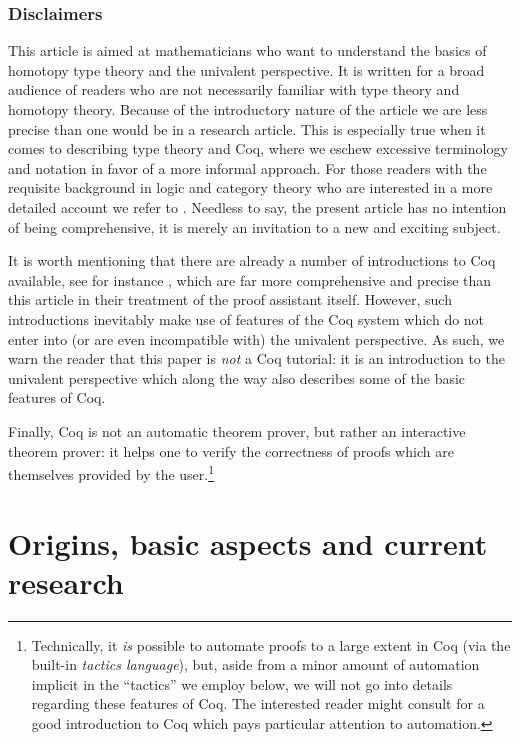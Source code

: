 \documentclass{amsart}
\theoremstyle{definition}
\theoremstyle{remark}
\numberwithin{equation}{section}
\begin{document}
\subsubsection*{Disclaimers}

This article is aimed at mathematicians who want to understand the basics
of homotopy type theory and the univalent perspective. It is
written for a broad audience of readers who are not necessarily
familiar with type theory and homotopy theory. Because of the
introductory nature of the article we are less precise than one would
be in a research article.  This is especially true when it comes to
describing type theory and Coq, where we eschew excessive terminology
and notation in favor of a more informal approach.  For those readers
with the requisite background in logic and category theory who are
interested in a more detailed account we refer to \cite{Awodey:TTH}.  Needless
to say, the present article has no intention of being comprehensive,
it is merely an invitation to a new and exciting subject.

It is worth mentioning that there are already a number of introductions
to Coq available, see for instance \cite{Bertot:2004uj}, which are far
more comprehensive and precise than this article in their treatment of
the proof assistant itself.  However, such introductions inevitably
make use of features of the Coq system which do not enter into (or are
even incompatible with) the univalent perspective.  As such, we warn
the reader that this paper is \emph{not} a Coq tutorial: it is an
introduction to the univalent perspective which along the way
also describes some of the basic features of Coq.

Finally, Coq is not an automatic theorem prover, but rather an interactive
theorem prover: it helps one to verify the correctness of proofs which
are themselves provided by the user.\footnote{Technically, it \emph{is}
  possible to automate proofs to a large extent in Coq (via the built-in
\emph{tactics language}), but, aside
  from a minor amount of automation implicit in the ``tactics'' we
  employ below, we will not go into details regarding these features
  of Coq.  The interested reader might consult \cite{Chlipala:CP} for a good
  introduction to Coq which pays particular attention to automation.}

\section{Origins, basic aspects and current research} \label{sec:origins}
\end{document}
